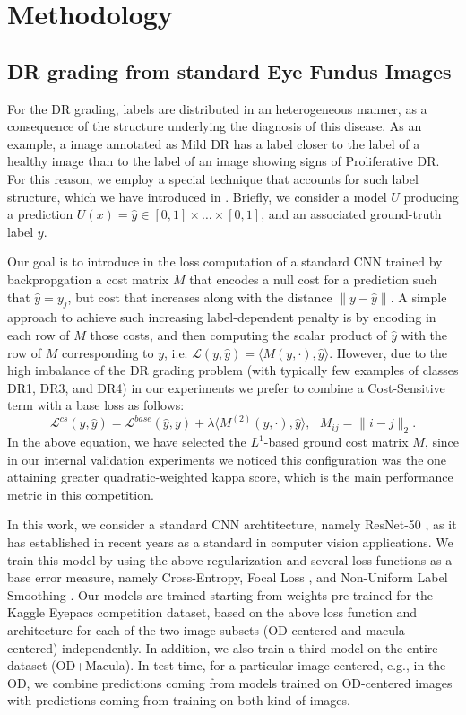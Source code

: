 \section{Methodology}
\subsection{DR grading from standard Eye Fundus Images}
For the DR grading, labels are distributed in an heterogeneous manner, as a consequence of the structure underlying the diagnosis of this disease.
As an example, a image annotated as Mild DR has a label closer to the label of a healthy image than to the label of an image showing signs of Proliferative DR.
For this reason, we employ a special technique that accounts for such label structure, which we have introduced in \cite{galdran_cost-sensitive_2020}.
Briefly, we consider a model $U$ producing a prediction $U(x)=\hat{y} \in [0,1]\times \displaystyle \ldots \times[0,1]$, and an associated ground-truth label $y$. 

Our goal is to introduce in the loss computation of a standard CNN trained by backpropgation a cost matrix $M$ that encodes a null cost for a prediction such that $\hat{y}=y_j$, but cost that increases along with the distance $\|y - \hat{y}\|$. 
A simple approach to achieve such increasing label-dependent penalty is by encoding in each row of $M$ those costs, and then computing the scalar product of $\hat{y}$ with the row of $M$ corresponding to $y$, i.e. $\mathcal{L}(y,\hat{y})=\langle M(y,\cdot), \hat{y} \rangle$. 
However, due to the high imbalance of the DR grading problem (with typically few examples of classes DR1, DR3, and DR4) in our experiments we prefer to combine a Cost-Sensitive term with a base loss as follows:
\begin{equation}\label{cs_loss}
\mathcal{L}^{cs}(y,\hat{y}) = \mathcal{L}^{base}(\hat{y},y) + \lambda \langle M^{(2)}(y,\cdot), \hat{y} \rangle, \ \ \  M_{ij}=\|i-j\|_2.
\end{equation}
In the above equation, we have selected the $L^1$-based ground cost matrix $M$, since in our internal validation experiments we noticed this configuration was the one attaining greater quadratic-weighted kappa score, which is the main performance metric in this competition.

In this work, we consider a standard CNN archtitecture, namely ResNet-50 \cite{he_deep_2016}, as it
has established in recent years as a standard in computer vision applications. 
We train this model by using the above regularization and several loss functions as a base error measure, namely Cross-Entropy, Focal Loss \cite{lin_focal_2020}, and Non-Uniform Label Smoothing \cite{galdran_non-uniform_2020}. 
Our models are trained starting from weights pre-trained for the Kaggle Eyepacs competition dataset, based on the above loss function and architecture for each of the two image subsets (OD-centered and macula-centered) independently. 
In addition, we also train a third model on the entire dataset (OD+Macula). 
In test time, for a particular image centered, e.g., in the OD, we combine predictions coming from models trained on OD-centered images with predictions coming from training on both kind of images.


